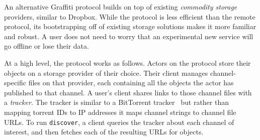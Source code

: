 An alternative Graffiti protocol builds on top of existing
\emph{commodity storage} providers,
similar to Dropbox.
While the protocol is less efficient than the remote
protocol, its bootstrapping off of existing
storage solutions makes it more familiar and robust.
A user does not need to worry that an experimental new service
will go offline or lose their data.

At a high level, the protocol works as follows.
Actors on the protocol store their objects on a storage
provider of their choice.
Their client manages channel-specific files on that provider,
each containing all the objects the actor has published to that channel.
A user's client shares links to those channel files
with a \emph{tracker}.
The tracker is similar to a BitTorrent tracker~\cite{bittorrent} but
rather than mapping torrent IDs to IP addresses
it maps channel strings to channel file URLs.
To run \texttt{discover}, a client queries the tracker
about each channel of interest,
and then fetches each of the resulting URLs for objects.



